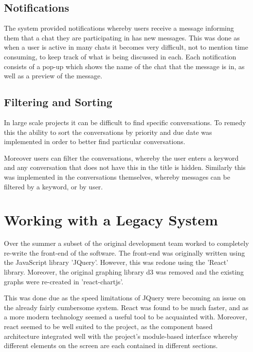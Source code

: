 \documentclass{l4proj}
\begin{document}
\subsection{Notifications}

The system provided notifications whereby users receive a message informing them that a chat they are participating in has new messages.  This was done as when a user is active in many chats it becomes very difficult, not to mention time consuming, to keep track of what is being discussed in each.  Each notification consists of a pop-up which shows the name of the chat that the message is in, as well as a preview of the message.

\subsection{Filtering and Sorting}

In large scale projects it can be difficult to find specific conversations.  To remedy this the ability to sort the conversations by priority and due date was implemented in order to better find particular conversations. 

Moreover users can filter the conversations, whereby the user enters a keyword and any conversation that does not have this in the title is hidden.  Similarly this was implemented in the conversations themselves, whereby messages can be filtered by a keyword, or by user.

\section{Working with a Legacy System}

Over the summer a subset of the original development team worked to completely re-write the front-end of the software.  The front-end was originally written using the JavaScript library 'JQuery'.  However, this was redone using the 'React' library.  Moreover, the original graphing library d3 was removed and the existing graphs were re-created in 'react-chartjs'.

This was done due as the speed limitations of JQuery were becoming an issue on the already fairly cumbersome system.  React was found to be much faster, and as a more modern technology seemed a useful tool to be acquainted with.  Moreover, react seemed to be well suited to the project, as the component based architecture integrated well with the project's module-based interface whereby different elements on the screen are each contained in different sections.
\end{document}
